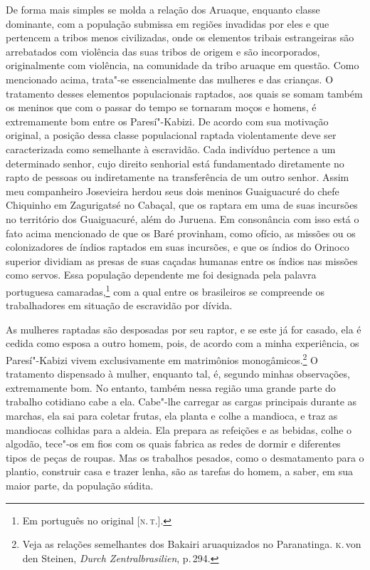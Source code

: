 De forma mais simples se molda a relação dos Aruaque, enquanto classe
dominante, com a população submissa em regiões invadidas por eles e que
pertencem a tribos menos civilizadas, onde os elementos tribais
estrangeiras são arrebatados com violência das suas tribos de origem e
são incorporados, originalmente com violência, na comunidade da tribo
aruaque em questão. Como mencionado acima, trata"-se essencialmente das
mulheres e das crianças. O tratamento desses elementos populacionais
raptados, aos quais se somam também os meninos que com o passar do
tempo se tornaram moços e homens, é extremamente bom entre os
Paresí"-Kabizi. De acordo com sua motivação original, a posição dessa
classe populacional raptada violentamente deve ser caracterizada como
semelhante à escravidão. Cada indivíduo pertence a um determinado
senhor, cujo direito senhorial está fundamentado diretamente no rapto de
pessoas ou indiretamente na transferência de um outro senhor. Assim meu
companheiro Josevieira herdou seus dois meninos Guaiguacuré do chefe
Chiquinho em Zagurigatsé no Cabaçal, que os raptara em uma de suas
incursões no território dos Guaiguacuré, além do Juruena. Em consonância
com isso está o fato acima mencionado de que os Baré provinham, como
ofício, as missões ou os colonizadores de índios raptados em suas
incursões, e que os índios do Orinoco superior dividiam as presas de
suas caçadas humanas entre os índios nas missões como servos. Essa
população dependente me foi designada pela palavra portuguesa
camaradas,\footnote{Em português no original {[}\textsc{n.\,t.}{]}.} com a qual entre os brasileiros se compreende os
trabalhadores em situação de escravidão por dívida.

As mulheres raptadas são desposadas por seu raptor, e se este já for
casado, ela é cedida como esposa a outro homem, pois, de acordo com a
minha experiência, os Paresí"-Kabizi vivem exclusivamente em matrimônios
monogâmicos.\footnote{Veja as relações semelhantes dos Bakairi aruaquizados no Paranatinga.
  \textsc{k}.\,von den Steinen, \textit{Durch Zentralbrasilien}, p.\,294.} O
tratamento dispensado à mulher, enquanto tal, é, segundo minhas
observações, extremamente bom. No entanto, também nessa região uma
grande parte do trabalho cotidiano cabe a ela. Cabe"-lhe carregar as
cargas principais durante as marchas, ela sai para coletar frutas, ela
planta e colhe a mandioca, e traz as mandiocas colhidas para a aldeia.
Ela prepara as refeições e as bebidas, colhe o algodão, tece"-os em fios
com os quais fabrica as redes de dormir e diferentes tipos de peças de
roupas. Mas os trabalhos pesados, como o desmatamento para o plantio,
construir casa e trazer lenha, são as tarefas do homem, a saber, em sua
maior parte, da população súdita.

